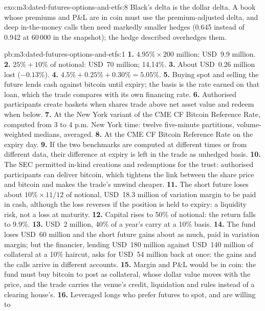 \begin{solution}{exo:m3:dated-futures-options-and-etfs:8}
Black's delta is the dollar delta. A book whose premiums and P\&L are in coin must use the premium-adjusted delta, and deep in-the-money
calls then need markedly smaller hedges (0.645 instead of 0.942 at 60\,000 in the snapshot); the hedge described overhedges them.
\end{solution}

\begin{solution}{pb:m3:dated-futures-options-and-etfs:1}
\textbf{1.} $4.95\% \times 200$ million: USD~9.9 million. \textbf{2.} $25\% + 10\%$ of notional: USD~70 million; 14.14\%. \textbf{3.}
About USD~0.26 million lost ($-0.13\%$). \textbf{4.} $4.5\% + 0.25\% + 0.30\% = 5.05\%$. \textbf{5.} Buying spot and selling the future
lends cash against bitcoin until expiry; the basis is the rate earned on that loan, which the trade compares with its own financing
rate. \textbf{6.} Authorised participants create baskets when shares trade above net asset value and redeem when below. \textbf{7.}
At the New York variant of the CME CF Bitcoin Reference Rate, computed from 3 to 4 p.m. New York time: twelve five-minute partitions,
volume-weighted medians, averaged. \textbf{8.} At the CME CF Bitcoin Reference Rate on the expiry day. \textbf{9.} If the two
benchmarks are computed at different times or from different data, their difference at expiry is left in the trade as unhedged basis.
\textbf{10.} The SEC permitted in-kind creations and redemptions for the trust: authorised participants can deliver bitcoin, which
tightens the link between the share price and bitcoin and makes the trade's unwind cheaper. \textbf{11.} The short future loses
about $10\% \times 11/12$ of notional, USD~18.3 million of variation margin to be paid in cash, although the loss reverses if the
position is held to expiry: a liquidity risk, not a loss at maturity. \textbf{12.} Capital rises to 50\% of notional: the return
falls to 9.9\%. \textbf{13.} USD~2 million, 40\% of a year's carry at a 10\% basis. \textbf{14.} The fund loses USD~60 million and the
short future gains about as much, paid in variation margin; but the financier, lending USD~180 million against USD~140 million of
collateral at a 10\% haircut, asks for USD~54 million back at once: the gains and the calls arrive in different accounts. \textbf{15.}
Margin and P\&L would be in coin: the fund must buy bitcoin to post as collateral, whose dollar value moves with the price, and the trade
carries the venue's credit, liquidation and  rules instead of a clearing house's. \textbf{16.} Leveraged longs who prefer futures to spot, and are willing to

\end{solution}
